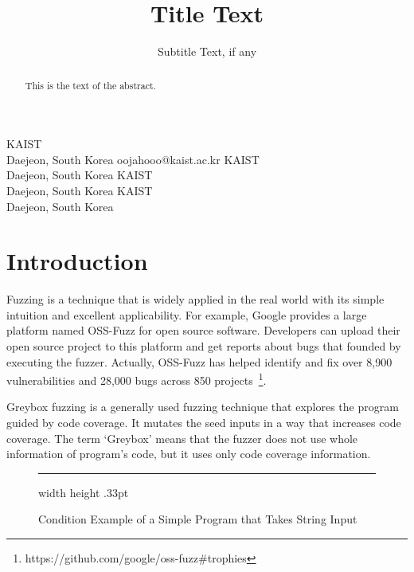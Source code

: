 \documentclass[12pt]{sigplanconf}
\begin{document}
\setlength{\pdfpageheight}{\paperheight}
\setlength{\pdfpagewidth}{\paperwidth}


\title{Title Text}
\subtitle{Subtitle Text, if any}

{KAIST \\
    Daejeon, South Korea
}
{oojahooo@kaist.ac.kr}
{KAIST \\
    Daejeon, South Korea
}
{}
{KAIST \\
    Daejeon, South Korea
}
{}
{KAIST \\
    Daejeon, South Korea
}
{}

\maketitle

\begin{abstract}
    This is the text of the abstract.
\end{abstract}

\section{Introduction}
Fuzzing is a technique that is widely applied in the real world with its simple intuition and excellent applicability.
For example, Google provides a large platform named OSS-Fuzz for open source software. Developers can upload their open
source project to this platform and get reports about bugs that founded by executing the fuzzer. Actually, OSS-Fuzz has
helped identify and fix over 8,900 vulnerabilities and 28,000 bugs across 850 projects~\footnote{https://github.com/google/oss-fuzz\#trophies}.

Greybox fuzzing is a generally used fuzzing technique that explores the program guided by code coverage. It mutates the
seed inputs in a way that increases code coverage. The term `Greybox' means that the fuzzer does not use whole information
of program's code, but it uses only code coverage information.

\begin{figure}[h]
    \cFormat
    
    \hrule width \hsize height .33pt
    \caption{Condition Example of a Simple Program that Takes String Input}
    \label{fig:string-example}
  \end{figure}
\end{document}
